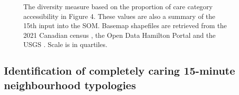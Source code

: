 \documentclass[
  authoryear,
  preprint,
  3p]{elsarticle}
\begin{document}
\begin{figure}


\caption{\label{fig-Fig5}The diversity measure based on the proportion
of care category accessibility in Figure 4. These values are also a
summary of the 15th input into the SOM. Basemap shapefiles are retrieved
from the 2021 Canadian census
\citep{governmentofcanadaCensusPopulation2023}, the Open Data Hamilton
Portal \citep{opendatahamiltonCityBoundary2023} and the USGS
\citep{greatlakesUSGS2010}. Scale is in quartiles.}

\end{figure}%

\subsection{Identification of completely caring 15-minute neighbourhood
typologies}\label{identification-of-completely-caring-15-minute-neighbourhood-typologies}
\end{document}
